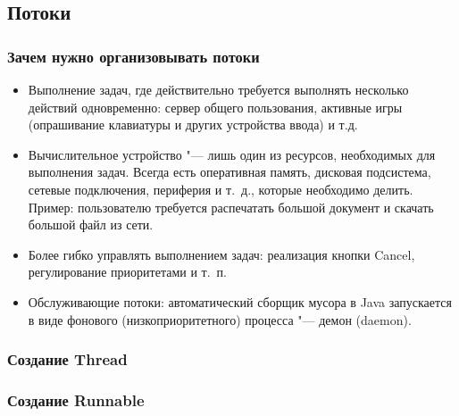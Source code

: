 \documentclass[default]{beamer}
\begin{document}
	\subsection{Потоки}
	\begin{frame}
		\frametitle{Зачем нужно организовывать потоки}
		
		\begin{itemize}
			\item Выполнение задач, где действительно требуется выполнять несколько действий одновременно: сервер общего пользования, активные игры (опрашивание клавиатуры и других устройства ввода) и т.д.
			\item Вычислительное устройство "--- лишь один из ресурсов, необходимых для выполнения задач. Всегда есть оперативная память, дисковая подсистема, сетевые подключения, периферия и т.~д., которые необходимо делить. Пример: пользователю требуется распечатать большой документ и скачать большой файл из сети.
			\item Более гибко управлять выполнением задач: реализация кнопки Cancel, регулирование приоритетами и т.~п.
			\item Обслуживающие потоки: автоматический сборщик мусора в Java запускается в виде фонового (низкоприоритетного) процесса "--- демон (daemon).
		\end{itemize}
	\end{frame}

	\begin{frame}
		\frametitle{Создание Thread}
		
		\lstThread
	\end{frame}

	\begin{frame}
		\frametitle{Создание Runnable}
		
		\lstRunnable
	\end{frame}
\end{document}
